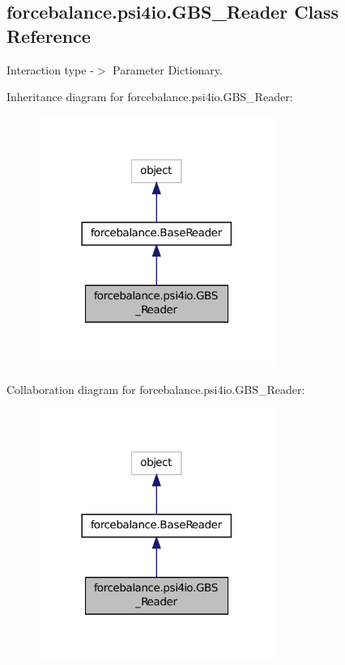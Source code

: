 \hypertarget{classforcebalance_1_1psi4io_1_1GBS__Reader}{\subsection{forcebalance.\-psi4io.\-G\-B\-S\-\_\-\-Reader Class Reference}
\label{classforcebalance_1_1psi4io_1_1GBS__Reader}
}


Interaction type -\/$>$ Parameter Dictionary.  




Inheritance diagram for forcebalance.\-psi4io.\-G\-B\-S\-\_\-\-Reader\-:
\nopagebreak
\begin{figure}[H]
\begin{center}
\leavevmode
\includegraphics[width=218pt]{classforcebalance_1_1psi4io_1_1GBS__Reader__inherit__graph}
\end{center}
\end{figure}


Collaboration diagram for forcebalance.\-psi4io.\-G\-B\-S\-\_\-\-Reader\-:
\nopagebreak
\begin{figure}[H]
\begin{center}
\leavevmode
\includegraphics[width=218pt]{classforcebalance_1_1psi4io_1_1GBS__Reader__coll__graph}
\end{center}
\end{figure}
